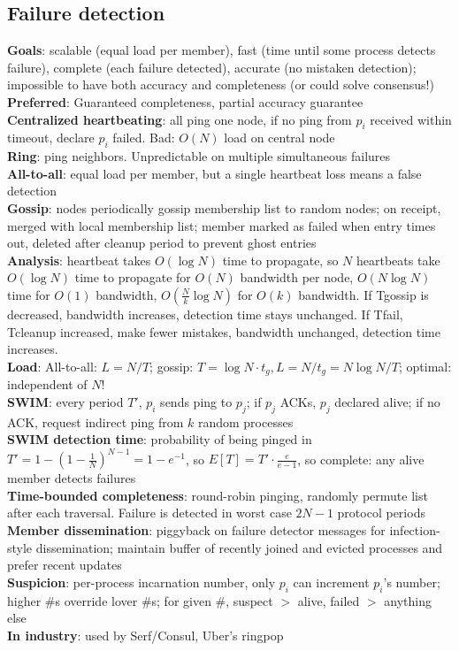 \documentclass{article}
\begin{document}
\begin{multicols*}{3}
\section{Failure detection}
\textbf{Goals}: scalable (equal load per member), fast (time until some process detects failure), complete (each failure detected), accurate (no mistaken detection); impossible to have both accuracy and completeness (or could solve consensus!) \\
\textbf{Preferred}: Guaranteed completeness, partial accuracy guarantee \\
\textbf{Centralized heartbeating}: all ping one node, if no ping from $p_i$ received within timeout, declare $p_i$ failed. Bad: $O(N)$ load on central node \\
\textbf{Ring}: ping neighbors. Unpredictable on multiple simultaneous failures \\
\textbf{All-to-all}: equal load per member, but a single heartbeat loss means a false detection \\
\textbf{Gossip}: nodes periodically gossip membership list to random nodes; on receipt, merged with local membership list; member marked as failed when entry times out, deleted after cleanup period to prevent ghost entries \\
\textbf{Analysis}: heartbeat takes $O(\log{N})$ time to propagate, so $N$ heartbeats take $O(\log{N})$ time to propagate for $O(N)$ bandwidth per node, $O(N\log{N})$ time for $O(1)$ bandwidth, $O(\frac{N}{k}\log{N})$ for $O(k)$ bandwidth. If Tgossip is decreased, bandwidth increases, detection time stays unchanged. If Tfail, Tcleanup increased, make fewer mistakes, bandwidth unchanged, detection time increases. \\
\textbf{Load}: All-to-all: $L=N/T$; gossip: $T=\log{N}\cdot t_g, L=N/t_g=N\log{N}/T$; optimal: independent of $N$! \\
\textbf{SWIM}: every period $T\prime$, $p_i$ sends ping to $p_j$; if $p_j$ ACKs, $p_j$ declared alive; if no ACK, request indirect ping from $k$ random processes \\
\textbf{SWIM detection time}: probability of being pinged in $T\prime = 1-(1-\frac{1}{N})^{N-1}=1-e^{-1}$, so $E[T] = T\prime\cdot\frac{e}{e-1}$, so complete: any alive member detects failures \\
\textbf{Time-bounded completeness}: round-robin pinging, randomly permute list after each traversal. Failure is detected in worst case $2N-1$ protocol periods \\
\textbf{Member dissemination}: piggyback on failure detector messages for infection-style dissemination; maintain buffer of recently joined and evicted processes and prefer recent updates \\
\textbf{Suspicion}: per-process incarnation number, only $p_i$ can increment $p_i$'s number; higher \#s override lover \#s; for given \#, suspect $>$ alive, failed $>$ anything else \\
\textbf{In industry}: used by Serf/Consul, Uber's ringpop


\end{multicols*}
\end{document}
